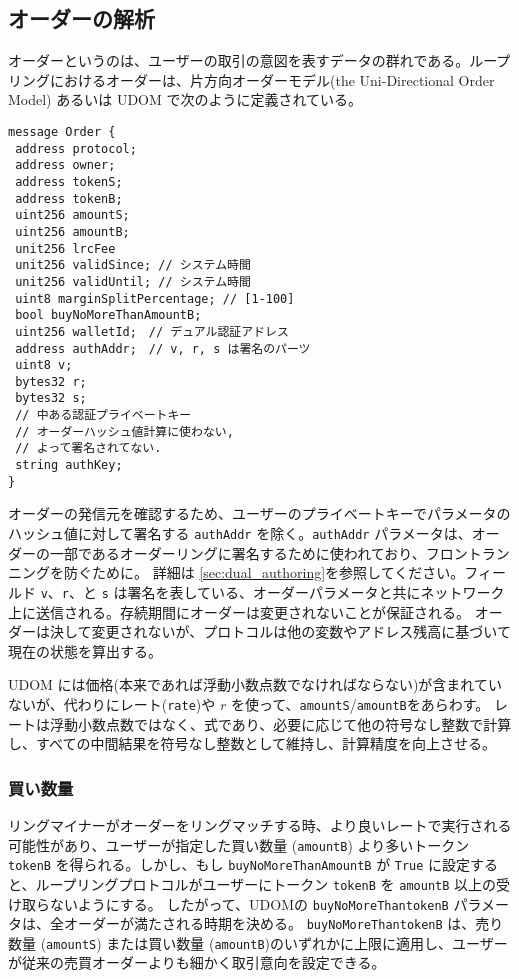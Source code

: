 \documentclass{article}
\begin{document}
\begin{multicols}{2}
\subsection{オーダーの解析\label{anatomy}}
オーダーというのは、ユーザーの取引の意図を表すデータの群れである。ループリングにおけるオーダーは、片方向オーダーモデル(the Uni-Directional Order Model)
あるいは UDOM で次のように定義されている。

\begin{verbatim}
message Order { 
 address protocol;
 address owner;
 address tokenS;
 address tokenB;
 uint256 amountS;
 uint256 amountB;
 unit256 lrcFee
 unit256 validSince; // システム時間
 unit256 validUntil; // システム時間
 uint8 marginSplitPercentage; // [1-100]
 bool buyNoMoreThanAmountB;
 uint256 walletId;　// デュアル認証アドレス
 address authAddr;　// v, r, s は署名のパーツ
 uint8 v;
 bytes32 r;
 bytes32 s;　　　　　　
 // 中ある認証プライベートキー
 // オーダーハッシュ値計算に使わない,
 // よって署名されてない.
 string authKey;
} 
\end{verbatim}


オーダーの発信元を確認するため、ユーザーのプライベートキーでパラメータのハッシュ値に対して署名する \verb|authAddr| を除く。\verb|authAddr| パラメータは、オーダーの一部であるオーダーリングに署名するために使われており、フロントランニングを防ぐために。 詳細は \ref{sec:dual_authoring}を参照してください。フィールド \verb|v|、\verb|r|、と \verb|s| は署名を表している、オーダーパラメータと共にネットワーク上に送信される。存続期間にオーダーは変更されないことが保証される。 オーダーは決して変更されないが、プロトコルは他の変数やアドレス残高に基づいて現在の状態を算出する。

UDOM には価格(本来であれば浮動小数点数でなければならない)が含まれていないが、代わりにレート(\verb|rate|)や $r$ を使って、\verb|amountS|/\verb|amountB|をあらわす。 レートは浮動小数点数ではなく、式であり、必要に応じて他の符号なし整数で計算し、すべての中間結果を符号なし整数として維持し、計算精度を向上させる。

\subsubsection{買い数量}
リングマイナーがオーダーをリングマッチする時、より良いレートで実行される可能性があり、ユーザーが指定した買い数量 (\verb|amountB|) より多いトークン \verb|tokenB| を得られる。しかし、もし \verb|buyNoMoreThanAmountB| が \verb|True| に設定すると、ループリングプロトコルがユーザーにトークン \verb|tokenB| を \verb|amountB| 以上の受け取らないようにする。 したがって、UDOMの \verb|buyNoMoreThantokenB| パラメータは、全オーダーが満たされる時期を決める。 \verb|buyNoMoreThantokenB| は、売り数量 (\verb|amountS|) または買い数量 (\verb|amountB|)のいずれかに上限に適用し、ユーザーが従来の売買オーダーよりも細かく取引意向を設定できる。


\end{multicols}
\end{document}
